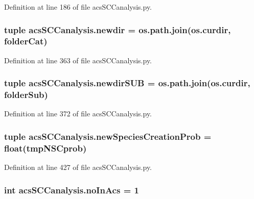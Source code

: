 Definition at line 186 of file acs\+S\+C\+Canalysis.\+py.

\hypertarget{a00130_a440179ca1c764cabcf9181985ae5dfb8}{
\subsubsection[{newdir}]{\setlength{\rightskip}{0pt plus 5cm}tuple acs\+S\+C\+Canalysis.\+newdir = os.\+path.\+join(os.\+curdir, {\bf folder\+Cat})}}\label{a00130_a440179ca1c764cabcf9181985ae5dfb8}


Definition at line 363 of file acs\+S\+C\+Canalysis.\+py.

\hypertarget{a00130_adb3b62d0896774bc87adfee19d047aa8}{
\subsubsection[{newdir\+S\+U\+B}]{\setlength{\rightskip}{0pt plus 5cm}tuple acs\+S\+C\+Canalysis.\+newdir\+S\+U\+B = os.\+path.\+join(os.\+curdir, {\bf folder\+Sub})}}\label{a00130_adb3b62d0896774bc87adfee19d047aa8}


Definition at line 372 of file acs\+S\+C\+Canalysis.\+py.

\hypertarget{a00130_a47b24df6e487f6dd90158dde93cc7c93}{
\subsubsection[{new\+Species\+Creation\+Prob}]{\setlength{\rightskip}{0pt plus 5cm}tuple acs\+S\+C\+Canalysis.\+new\+Species\+Creation\+Prob = float(tmp\+N\+S\+Cprob)}}\label{a00130_a47b24df6e487f6dd90158dde93cc7c93}


Definition at line 427 of file acs\+S\+C\+Canalysis.\+py.

\hypertarget{a00130_a4766b3ca835449f1aa287fda699c7f96}{
\subsubsection[{no\+In\+Acs}]{\setlength{\rightskip}{0pt plus 5cm}int acs\+S\+C\+Canalysis.\+no\+In\+Acs = 1}}\label{a00130_a4766b3ca835449f1aa287fda699c7f96}


